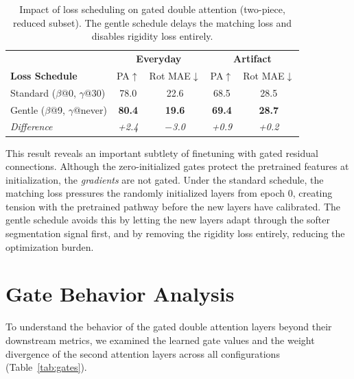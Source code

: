 \begin{table}[H]
\centering
\caption{Impact of loss scheduling on gated double attention (two-piece, reduced subset). The gentle schedule delays the matching loss and disables rigidity loss entirely.}
\label{tab:loss_schedule}
\begin{tabular}{lcc|cc}
\toprule
& \multicolumn{2}{c|}{\textbf{Everyday}} & \multicolumn{2}{c}{\textbf{Artifact}} \\
\textbf{Loss Schedule} & PA$\uparrow$ & Rot MAE$\downarrow$ & PA$\uparrow$ & Rot MAE$\downarrow$ \\
\midrule
Standard ($\beta$@0, $\gamma$@30) & 78.0 & 22.6 & 68.5 & 28.5 \\
Gentle ($\beta$@9, $\gamma$@never) & \textbf{80.4} & \textbf{19.6} & \textbf{69.4} & \textbf{28.7} \\
\midrule
\textit{Difference} & \textit{+2.4} & \textit{$-$3.0} & \textit{+0.9} & \textit{+0.2} \\
\bottomrule
\end{tabular}
\end{table}

This result reveals an important subtlety of finetuning with gated residual connections. Although the zero-initialized gates protect the pretrained features at initialization, the \textit{gradients} are not gated. Under the standard schedule, the matching loss pressures the randomly initialized layers from epoch 0, creating tension with the pretrained pathway before the new layers have calibrated. The gentle schedule avoids this by letting the new layers adapt through the softer segmentation signal first, and by removing the rigidity loss entirely, reducing the optimization burden.

\section{Gate Behavior Analysis}
\label{sec:gate_introspection}

To understand the behavior of the gated double attention layers beyond their downstream metrics, we examined the learned gate values and the weight divergence of the second attention layers across all configurations (Table~\ref{tab:gates}).


